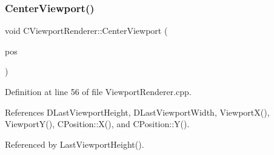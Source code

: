 \subsubsection{\texorpdfstring{Center\+Viewport()}{CenterViewport()}}
{\footnotesize\ttfamily void C\+Viewport\+Renderer\+::\+Center\+Viewport (\begin{DoxyParamCaption}\item[{const \hyperlink{classCPosition}{C\+Position} \&}]{pos }\end{DoxyParamCaption})}



Definition at line 56 of file Viewport\+Renderer.\+cpp.



References D\+Last\+Viewport\+Height, D\+Last\+Viewport\+Width, Viewport\+X(), Viewport\+Y(), C\+Position\+::\+X(), and C\+Position\+::\+Y().



Referenced by Last\+Viewport\+Height().


